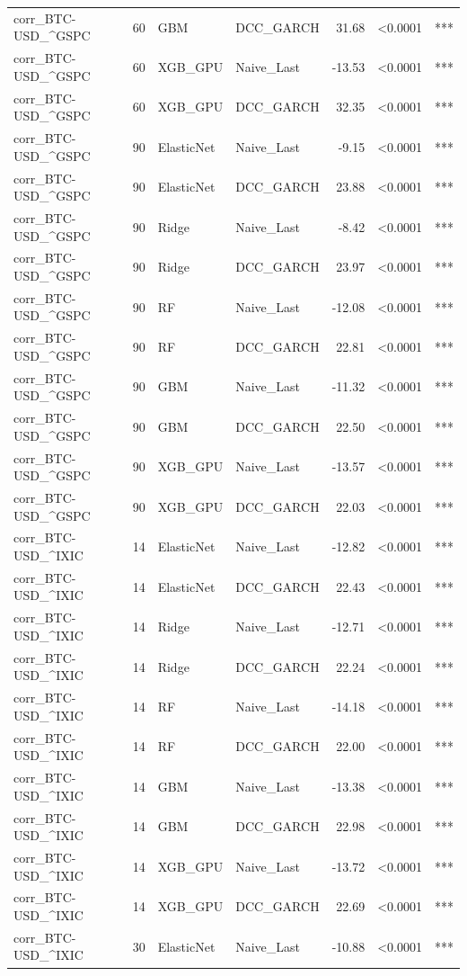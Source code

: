\begin{table}[H]
\begin{tabular}{llllrrl}
corr_BTC-USD_^GSPC & 60 & GBM & DCC_GARCH & 31.68 & <0.0001 & *** \\
corr_BTC-USD_^GSPC & 60 & XGB_GPU & Naive_Last & -13.53 & <0.0001 & *** \\
corr_BTC-USD_^GSPC & 60 & XGB_GPU & DCC_GARCH & 32.35 & <0.0001 & *** \\
corr_BTC-USD_^GSPC & 90 & ElasticNet & Naive_Last & -9.15 & <0.0001 & *** \\
corr_BTC-USD_^GSPC & 90 & ElasticNet & DCC_GARCH & 23.88 & <0.0001 & *** \\
corr_BTC-USD_^GSPC & 90 & Ridge & Naive_Last & -8.42 & <0.0001 & *** \\
corr_BTC-USD_^GSPC & 90 & Ridge & DCC_GARCH & 23.97 & <0.0001 & *** \\
corr_BTC-USD_^GSPC & 90 & RF & Naive_Last & -12.08 & <0.0001 & *** \\
corr_BTC-USD_^GSPC & 90 & RF & DCC_GARCH & 22.81 & <0.0001 & *** \\
corr_BTC-USD_^GSPC & 90 & GBM & Naive_Last & -11.32 & <0.0001 & *** \\
corr_BTC-USD_^GSPC & 90 & GBM & DCC_GARCH & 22.50 & <0.0001 & *** \\
corr_BTC-USD_^GSPC & 90 & XGB_GPU & Naive_Last & -13.57 & <0.0001 & *** \\
corr_BTC-USD_^GSPC & 90 & XGB_GPU & DCC_GARCH & 22.03 & <0.0001 & *** \\
corr_BTC-USD_^IXIC & 14 & ElasticNet & Naive_Last & -12.82 & <0.0001 & *** \\
corr_BTC-USD_^IXIC & 14 & ElasticNet & DCC_GARCH & 22.43 & <0.0001 & *** \\
corr_BTC-USD_^IXIC & 14 & Ridge & Naive_Last & -12.71 & <0.0001 & *** \\
corr_BTC-USD_^IXIC & 14 & Ridge & DCC_GARCH & 22.24 & <0.0001 & *** \\
corr_BTC-USD_^IXIC & 14 & RF & Naive_Last & -14.18 & <0.0001 & *** \\
corr_BTC-USD_^IXIC & 14 & RF & DCC_GARCH & 22.00 & <0.0001 & *** \\
corr_BTC-USD_^IXIC & 14 & GBM & Naive_Last & -13.38 & <0.0001 & *** \\
corr_BTC-USD_^IXIC & 14 & GBM & DCC_GARCH & 22.98 & <0.0001 & *** \\
corr_BTC-USD_^IXIC & 14 & XGB_GPU & Naive_Last & -13.72 & <0.0001 & *** \\
corr_BTC-USD_^IXIC & 14 & XGB_GPU & DCC_GARCH & 22.69 & <0.0001 & *** \\
corr_BTC-USD_^IXIC & 30 & ElasticNet & Naive_Last & -10.88 & <0.0001 & *** \\

\end{tabular}
\end{table}
